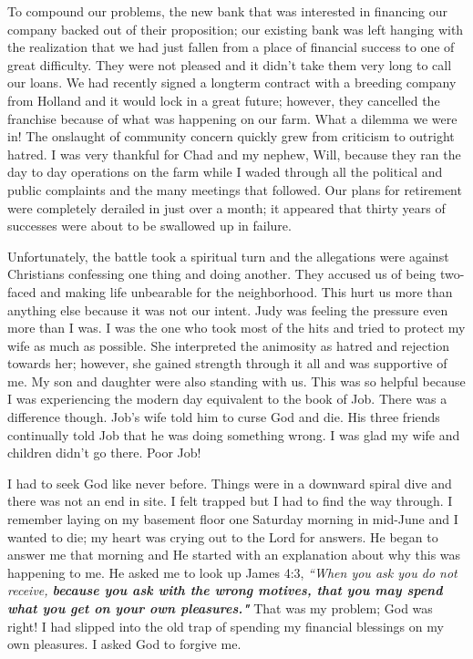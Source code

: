 \documentclass[oneside]{book}
\begin{document}
To compound our problems, the new bank that was interested in financing our company backed out of their proposition; our existing bank was left hanging with the realization that we had just fallen from a place of financial success to one of great difficulty. They were not pleased and it didn't take them very long to call our loans. We had recently signed a longterm contract with a breeding company from Holland and it would lock in a great future; however, they cancelled the franchise because of what was happening on our farm. What a dilemma we were in! The onslaught of community concern quickly grew from criticism to outright hatred. I was very thankful for Chad and my nephew, Will, because they ran the day to day operations on the farm while I waded through all the political and public complaints and the many meetings that followed. Our plans for retirement were completely derailed in just over a month; it appeared that thirty years of successes were about to be swallowed up in failure.

Unfortunately, the battle took a spiritual turn and the allegations were against Christians confessing one thing and doing another. They accused us of being two-faced and making life unbearable for the neighborhood. This hurt us more than anything else because it was not our intent. Judy was feeling the pressure even more than I was. I was the one who took most of the hits and tried to protect my wife as much as possible. She interpreted the animosity as hatred and rejection towards her; however, she gained strength through it all and was supportive of me. My son and daughter were also standing with us. This was so helpful because I was experiencing the modern day equivalent to the book of Job. There was a difference though. Job's wife told him to curse God and die. His three friends continually told Job that he was doing something wrong. I was glad my wife and children didn't go there. Poor Job!


I had to seek God like never before. Things were in a downward spiral dive and there was not an end in site. I felt trapped but I had to find the way through. I remember laying on my basement floor one Saturday morning in mid-June and I wanted to die; my heart was crying out to the Lord for answers. He began to answer me that morning and He started with an explanation about why this was happening to me. He asked me to look up James 4:3, \textit{``When you ask you do not receive, \textbf{because you ask with the wrong motives, that you may spend what you get on your own pleasures."}} That was my problem; God was right! I had slipped into the old trap of spending my financial blessings on my own pleasures. I asked God to forgive me.
\end{document}
